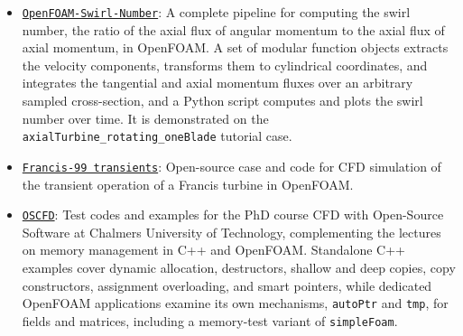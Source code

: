 \begin{itemize}[]
    \item \href{https://github.com/salehisaeed/OpenFOAM-Swirl-Number}{\texttt{OpenFOAM-Swirl-Number}}: A complete pipeline for computing the swirl number, the ratio of the axial flux of angular momentum to the axial flux of axial momentum, in OpenFOAM. A set of modular function objects extracts the velocity components, transforms them to cylindrical coordinates, and integrates the tangential and axial momentum fluxes over an arbitrary sampled cross-section, and a Python script computes and plots the swirl number over time. It is demonstrated on the \texttt{axialTurbine\_rotating\_oneBlade} tutorial case.

    \item \href{https://dataverse.harvard.edu/dataset.xhtml?persistentId=doi:10.7910/DVN/31JGOM}{\texttt{Francis-99 transients}}: Open-source case and code for CFD simulation of the transient operation of a Francis turbine in OpenFOAM.

    \item \href{https://github.com/salehisaeed/OSCFD}{\texttt{OSCFD}}: Test codes and examples for the PhD course CFD with Open-Source Software at Chalmers University of Technology, complementing the lectures on memory management in C++ and OpenFOAM. Standalone C++ examples cover dynamic allocation, destructors, shallow and deep copies, copy constructors, assignment overloading, and smart pointers, while dedicated OpenFOAM applications examine its own mechanisms, \texttt{autoPtr} and \texttt{tmp}, for fields and matrices, including a memory-test variant of \texttt{simpleFoam}.
\end{itemize}
